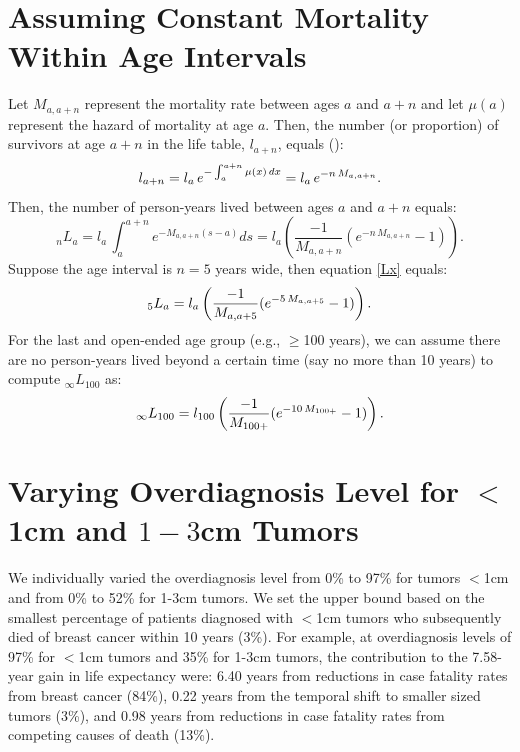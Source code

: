 \documentclass[11pt,letterpaper]{article}
\theoremstyle{plain}
\theoremstyle{remark}
\numberwithin{equation}{section}
\begin{document}
\section{Assuming Constant Mortality Within Age Intervals}
Let $M_{a,a+n}$ represent the mortality rate between ages $a$ and
$a+n$ and let $\mu(a)$ represent the hazard of mortality at age
$a$. Then, the number (or proportion) of survivors at age $a+n$ in the
life table, $l_{a+n}$, equals (\cite{PreHeuGui00}):
\begin{equation}
l_{a+n}=l_{a}\,e^{-\int_a^{a+n}\mu(x)\,dx}=l_{a}\,e^{-n\,M_{a,a+n}}.\notag
\end{equation}
Then, the number of person-years lived between ages $a$ and $a+n$ equals:
\begin{equation}
_nL_{a}=l_a\,\int_a^{a+n} e^{-M_{a,a+n}(s-a)} ds=l_a \left(\frac{-1}{M_{a,a+n}}(e^{-n\,M_{a,a+n}}-1) \right).
\label{Lx}
\end{equation}
Suppose the age interval is $n=5$ years wide, then equation \eqref{Lx}
equals:
\begin{equation}
_5L_{a}=l_a \left(\frac{-1}{M_{a,a+5}}(e^{-5\,M_{a,a+5}}-1) \right).\notag
\end{equation}
For the last and open-ended age group (e.g., $\geq$100 years), we can assume there
are no person-years lived beyond a certain time (say no more than 10
years) to compute $_{\infty}L_{100}$ as:
\begin{equation}
_{\infty}L_{100}=l_{100} \left(\frac{-1}{M_{100+}}(e^{-10\,M_{100+}}-1) \right).\notag
\end{equation}


\newpage
\section{Varying Overdiagnosis Level for $<$1cm and $1-3$cm Tumors}
We individually varied the overdiagnosis level from 0\% to 97\% for
tumors $<$1cm and from 0\% to 52\% for 1-3cm tumors.  We set the upper
bound based on the smallest percentage of patients diagnosed with $<$1cm
tumors who subsequently died of breast cancer within 10 years (3\%).
For example, at overdiagnosis levels of 97\% for $<$1cm tumors and
35\% for 1-3cm tumors, the contribution to the 7.58-year gain in life
expectancy were: 6.40 years from reductions in case fatality rates
from breast cancer (84\%), 0.22 years from the temporal shift to
smaller sized tumors (3\%), and 0.98 years from reductions in case
fatality rates from competing causes of death (13\%).
\end{document}
